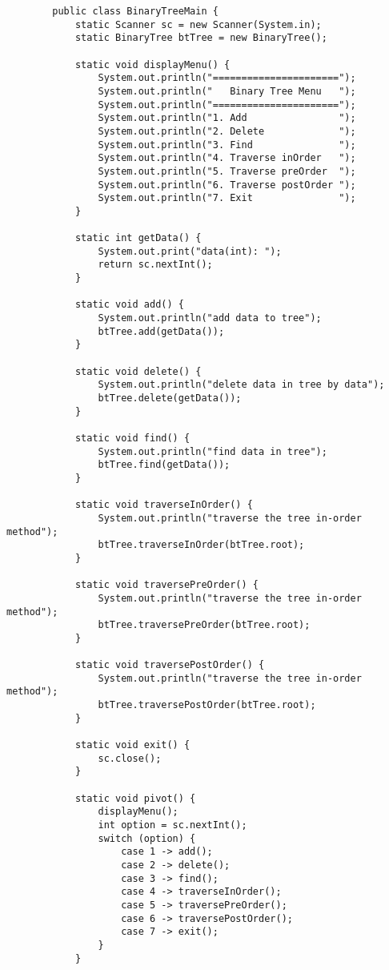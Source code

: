 \documentclass[12pt,titlepage]{article}
\begin{document}
\begin{enumerate}
\begin{verbatim}
        public class BinaryTreeMain {
            static Scanner sc = new Scanner(System.in);
            static BinaryTree btTree = new BinaryTree();
            
            static void displayMenu() {
                System.out.println("======================");
                System.out.println("   Binary Tree Menu   ");
                System.out.println("======================");
                System.out.println("1. Add                ");
                System.out.println("2. Delete             ");
                System.out.println("3. Find               ");
                System.out.println("4. Traverse inOrder   ");
                System.out.println("5. Traverse preOrder  ");
                System.out.println("6. Traverse postOrder ");
                System.out.println("7. Exit               ");
            }

            static int getData() {
                System.out.print("data(int): ");
                return sc.nextInt();
            }

            static void add() {
                System.out.println("add data to tree");
                btTree.add(getData());
            }

            static void delete() {
                System.out.println("delete data in tree by data");
                btTree.delete(getData());
            }

            static void find() {
                System.out.println("find data in tree");
                btTree.find(getData());
            }

            static void traverseInOrder() {
                System.out.println("traverse the tree in-order method");
                btTree.traverseInOrder(btTree.root);
            }
            
            static void traversePreOrder() {
                System.out.println("traverse the tree in-order method");
                btTree.traversePreOrder(btTree.root);
            }
            
            static void traversePostOrder() {
                System.out.println("traverse the tree in-order method");
                btTree.traversePostOrder(btTree.root);
            }

            static void exit() {
                sc.close();
            }

            static void pivot() {
                displayMenu();
                int option = sc.nextInt();
                switch (option) {
                    case 1 -> add();
                    case 2 -> delete();
                    case 3 -> find();
                    case 4 -> traverseInOrder();
                    case 5 -> traversePreOrder();
                    case 6 -> traversePostOrder();
                    case 7 -> exit();
                }
            }


\end{verbatim}
\end{enumerate}
\end{document}
